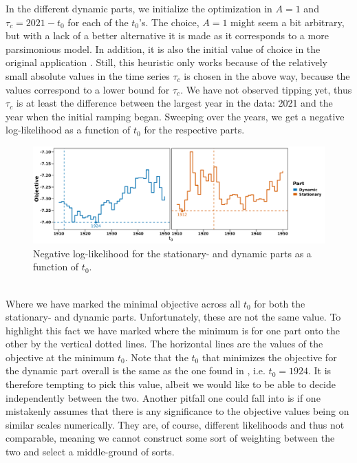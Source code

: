 In the different dynamic parts, we initialize the optimization in $A = 1$ and $\tau_c = 2021 - t_0$ for each of the $t_0$'s. The choice, $A = 1$ might seem a bit arbitrary, but with a lack of a better alternative it is made as it corresponds to a more parsimonious model. In addition, it is also the initial value of choice in the original application \cite{Ditlevsen2023}. Still, this heuristic only works because of the relatively small absolute values in the time series $\tau_c$ is chosen in the above way, because the values correspond to a lower bound for $\tau_c$. We have not observed tipping yet, thus $\tau_c$ is at least the difference between the largest year in the data: 2021 and the year when the initial ramping began. Sweeping over the years, we get a negative log-likelihood as a function of $t_0$ for the respective parts.
\begin{figure}[h!]
    \begin{center}
    \includegraphics[scale = .095]{figures/ramping_year_likelihood_plot.jpeg}
    \caption{Negative log-likelihood for the stationary- and dynamic parts as a function of $t_0$.}
    \label{figure:negLoglikRamping}        
    \end{center}
\end{figure}\\
Where we have marked the minimal objective across all $t_0$ for both the stationary- and dynamic parts. Unfortunately, these are not the same value. To highlight this fact we have marked where the minimum is for one part onto the other by the vertical dotted lines. The horizontal lines are the values of the objective at the minimum $t_0$. Note that the $t_0$ that minimizes the objective for the dynamic part overall is the same as the one found in \cite{Ditlevsen2023}, i.e. $t_0 = 1924$. It is therefore tempting to pick this value, albeit we would like to be able to decide independently between the two. Another pitfall one could fall into is if one mistakenly assumes that there is any significance to the objective values being on similar scales numerically. They are, of course, different likelihoods and thus not comparable, meaning we cannot construct some sort of weighting between the two and select a middle-ground of sorts.
